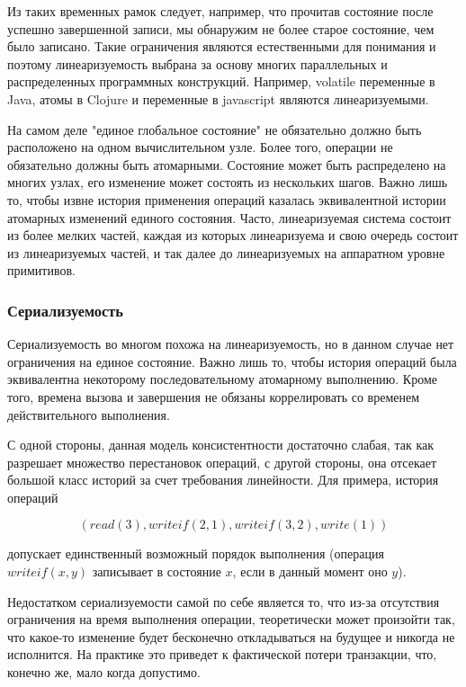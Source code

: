 Из таких временных рамок следует, например, что прочитав состояние после успешно завершенной записи, мы обнаружим не более старое состояние, чем было записано. Такие ограничения являются естественными для понимания и поэтому линеаризуемость выбрана за основу многих параллельных и распределенных программных конструкций. Например, volatile переменные в Java, атомы в Clojure и переменные в javascript являются линеаризуемыми.

На самом деле "единое глобальное состояние" не обязательно должно быть расположено на одном вычислительном узле. Более того, операции не обязательно должны быть атомарными. Состояние может быть распределено на многих узлах, его изменение может состоять из нескольких шагов. Важно лишь то, чтобы извне история применения операций казалась эквивалентной истории атомарных изменений единого состояния. Часто, линеаризуемая система состоит из более мелких частей, каждая из которых линеаризуема и свою очередь состоит из линеаризуемых частей, и так далее до линеаризуемых на аппаратном уровне примитивов.

\subsubsection{Сериализуемость}

Сериализуемость во многом похожа на линеаризуемость, но в данном случае нет ограничения на единое состояние. Важно лишь то, чтобы история операций была эквивалентна некоторому последовательному атомарному выполнению. Кроме того, времена вызова и завершения не обязаны коррелировать со временем действительного выполнения.

С одной стороны, данная модель консистентности достаточно слабая, так как разрешает множество перестановок операций, с другой стороны, она отсекает большой класс историй за счет требования линейности. Для примера, история операций

$$ (read(3), writeif(2, 1), writeif(3, 2), write(1)) $$

допускает единственный возможный порядок выполнения (операция $writeif(x, y)$ записывает в состояние $x$, если в данный момент оно $y$).

Недостатком сериализуемости самой по себе является то, что из-за отсутствия ограничения на время выполнения операции, теоретически может произойти так, что какое-то изменение будет бесконечно откладываться на будущее и никогда не исполнится. На практике это приведет к фактической потери транзакции, что, конечно же, мало когда допустимо.

